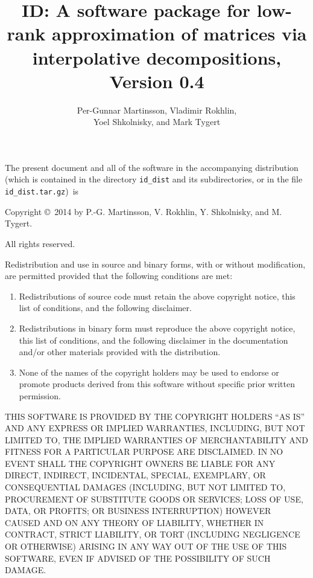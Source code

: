 ﻿\documentclass[letterpaper,12pt]{article}
\title{ID: A software package for low-rank approximation
       of matrices via interpolative decompositions, Version 0.4}
\author{Per-Gunnar Martinsson, Vladimir Rokhlin,\\
        Yoel Shkolnisky, and Mark Tygert}
\begin{document}
\maketitle

\newpage

{\parindent=0pt

The present document and all of the software
in the accompanying distribution (which is contained in the directory
{\tt id\_dist} and its subdirectories, or in the file
{\tt id\_dist.tar.gz})\, is

\bigskip

Copyright \copyright\ 2014 by P.-G. Martinsson, V. Rokhlin,
Y. Shkolnisky, and M. Tygert.

\bigskip

All rights reserved.

\bigskip

Redistribution and use in source and binary forms, with or without
modification, are permitted provided that the following conditions are
met:

\begin{enumerate}
\item Redistributions of source code must retain the above copyright
notice, this list of conditions, and the following disclaimer.
\item Redistributions in binary form must reproduce the above copyright
notice, this list of conditions, and the following disclaimer in the
documentation and/or other materials provided with the distribution.
\item None of the names of the copyright holders may be used to endorse
or promote products derived from this software without specific prior
written permission.
\end{enumerate}

\bigskip

THIS SOFTWARE IS PROVIDED BY THE COPYRIGHT HOLDERS ``AS IS'' AND ANY
EXPRESS OR IMPLIED WARRANTIES, INCLUDING, BUT NOT LIMITED TO, THE
IMPLIED WARRANTIES OF MERCHANTABILITY AND FITNESS FOR A PARTICULAR
PURPOSE ARE DISCLAIMED. IN NO EVENT SHALL THE COPYRIGHT OWNERS BE
LIABLE FOR ANY DIRECT, INDIRECT, INCIDENTAL, SPECIAL, EXEMPLARY, OR
CONSEQUENTIAL DAMAGES (INCLUDING, BUT NOT LIMITED TO, PROCUREMENT OF
SUBSTITUTE GOODS OR SERVICES; LOSS OF USE, DATA, OR PROFITS; OR
BUSINESS INTERRUPTION) HOWEVER CAUSED AND ON ANY THEORY OF LIABILITY,
WHETHER IN CONTRACT, STRICT LIABILITY, OR TORT (INCLUDING NEGLIGENCE OR
OTHERWISE) ARISING IN ANY WAY OUT OF THE USE OF THIS SOFTWARE, EVEN IF
ADVISED OF THE POSSIBILITY OF SUCH DAMAGE.

}
\end{document}
